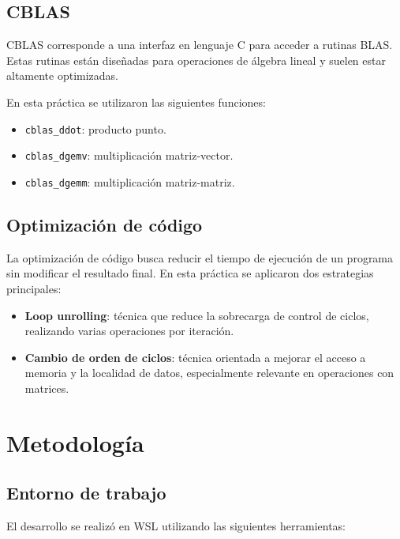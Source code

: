 \documentclass[12pt,letterpaper]{article}
\begin{document}
\subsection{CBLAS}

CBLAS corresponde a una interfaz en lenguaje C para acceder a rutinas BLAS. Estas rutinas están diseñadas para operaciones de álgebra lineal y suelen estar altamente optimizadas.

En esta práctica se utilizaron las siguientes funciones:

\begin{itemize}
    \item \texttt{cblas\_ddot}: producto punto.
    \item \texttt{cblas\_dgemv}: multiplicación matriz-vector.
    \item \texttt{cblas\_dgemm}: multiplicación matriz-matriz.
\end{itemize}

\subsection{Optimización de código}

La optimización de código busca reducir el tiempo de ejecución de un programa sin modificar el resultado final. En esta práctica se aplicaron dos estrategias principales:

\begin{itemize}
    \item \textbf{Loop unrolling}: técnica que reduce la sobrecarga de control de ciclos, realizando varias operaciones por iteración.
    \item \textbf{Cambio de orden de ciclos}: técnica orientada a mejorar el acceso a memoria y la localidad de datos, especialmente relevante en operaciones con matrices.
\end{itemize}

\section{Metodología}

\subsection{Entorno de trabajo}

El desarrollo se realizó en WSL utilizando las siguientes herramientas:
\end{document}
